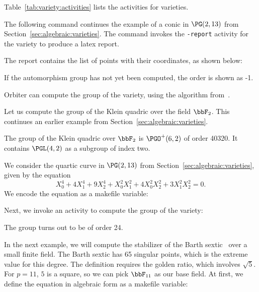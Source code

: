 

Table~\ref{tab:variety:activities} lists the activities  
for varieties.

\bigskip


The following command continues the example of a conic in $\PG(2,13)$ from Section~\ref{sec:algebraic:varieties}.
The command invokes the \verb'-report' activity for the variety to produce a latex report. 




The report contains the list of points with their coordinates, as shown below:




If the automorphism group has not yet been computed, the order is shown as -1.



\bigskip



Orbiter can compute the group of the variety, 
using the algorithm from~\cite{AlazemiBetten2024}. 

\bigskip


Let us compute the group of the Klein quadric over the field $\bbF_2$. 
This continues an earlier example 
from Section~\ref{sec:algebraic:varieties}.



The group of the Klein quadric over $\bbF_2$ is $\PGO^+(6,2)$ of order 40320. 
It contains $\PGL(4,2)$ as a subgroup of index two.


\bigskip



We consider the quartic curve in $\PG(2,13)$ 
from Section~\ref{sec:algebraic:varieties}, 
given by the equation
$$
X_0^4 + 4X_1^4 + 9X_2^4 + X_0^2X_1^2 + 4X_0^2X_2^2 + 3X_1^2X_2^2=0.
$$
We encode the equation as a makefile variable:



Next, we invoke an activity to compute the group of the variety:


The group turns out to be of order 24. 

\bigskip

In the next example, 
we will compute the stabilizer 
of the Barth sextic~\cite{Barth1996} 
over a small finite field.
The Barth sextic has 65 singular points, 
which is the extreme value for this degree.
The definition requires the golden ratio, 
which involves $\sqrt{5}.$ 
For $p= 11$, $5$ is a square, so 
we can pick $\bbF_{11}$ as our base field.
At first, we define the equation in algebraic form as a makefile variable:

